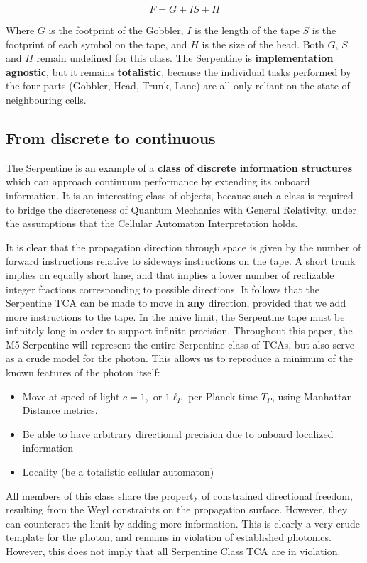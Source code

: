 \documentclass[notitlepage]{article}
\begin{document}
\begin{equation}
F = G + IS + H
\end{equation}

Where $G$ is the footprint of the Gobbler, $I$ is the length of the tape $S$ is the footprint of each symbol on the tape, and $H$ is the size of the head. Both $G$, $S$ and $H$ remain undefined for this class. The Serpentine is \textbf{implementation agnostic}, but it remains \textbf{totalistic}, because the individual tasks performed by the four parts (Gobbler, Head, Trunk, Lane) are all only reliant on the state of neighbouring cells. 

\subsection{From discrete to continuous}
The Serpentine is an example of a \textbf{class of discrete information structures} which can approach continuum performance by extending its onboard information. It is an interesting class of objects, because such a class is required to bridge the discreteness of Quantum Mechanics with General Relativity, under the assumptions that the Cellular Automaton Interpretation holds.

It is clear that the propagation direction through space is given by the number of forward instructions relative to sideways instructions on the tape. A short trunk implies an equally short lane, and that implies a lower number of realizable integer fractions corresponding to possible directions. It follows that the Serpentine TCA can be made to move in \textbf{any} direction, provided that we add more instructions to the tape. In the naive limit, the Serpentine tape must be infinitely long in order to support infinite precision. Throughout this paper, the M5 Serpentine will represent the entire Serpentine class of TCAs, but also serve as a crude model for the photon. This allows us to reproduce a minimum of the known features of the photon itself:

\begin{itemize}
\item Move at speed of light $c = 1, $  or $1\ell_P $ per Planck time $T_P$, using Manhattan Distance metrics.
\item Be able to have arbitrary directional precision due to onboard localized information
\item Locality (be a totalistic cellular automaton)
\end{itemize} 

All members of this class share the property of constrained directional freedom, resulting from the Weyl constraints on the propagation surface. However, they can counteract the limit by adding more information.
This is clearly a very crude template for the photon, and remains in violation of established photonics. However, this does not imply that all Serpentine Class TCA are in violation. 
\end{document}
